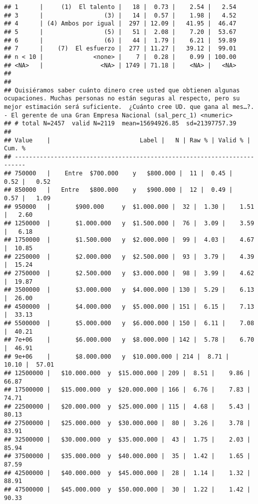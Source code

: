\documentclass[
  10,
  landscape,
  legalpaper]{article}
\begin{document}
\begin{verbatim}
## 1      |     (1)  El talento |   18 |  0.73 |    2.54 |   2.54
## 3      |                 (3) |   14 |  0.57 |    1.98 |   4.52
## 4      | (4) Ambos por igual |  297 | 12.09 |   41.95 |  46.47
## 5      |                 (5) |   51 |  2.08 |    7.20 |  53.67
## 6      |                 (6) |   44 |  1.79 |    6.21 |  59.89
## 7      |    (7)  El esfuerzo |  277 | 11.27 |   39.12 |  99.01
## n < 10 |              <none> |    7 |  0.28 |    0.99 | 100.00
## <NA>   |                <NA> | 1749 | 71.18 |    <NA> |   <NA>
## 
## 
## Quisiéramos saber cuánto dinero cree usted que obtienen algunas ocupaciones. Muchas personas no están seguras al respecto, pero su mejor estimación será suficiente.  ¿Cuánto cree UD. que gana al mes…?. - El gerente de una Gran Empresa Nacional (sal_perc_1) <numeric>
## # total N=2457  valid N=2119  mean=15694926.85  sd=21397757.39
## 
## Value    |                         Label |   N | Raw % | Valid % | Cum. %
## -------------------------------------------------------------------------
## 750000   |    Entre  $700.000    y   $800.000 |  11 |  0.45 |    0.52 |   0.52
## 850000   |   Entre   $800.000    y   $900.000 |  12 |  0.49 |    0.57 |   1.09
## 950000   |       $900.000     y  $1.000.000 |  32 |  1.30 |    1.51 |   2.60
## 1250000  |       $1.000.000   y  $1.500.000 |  76 |  3.09 |    3.59 |   6.18
## 1750000  |       $1.500.000   y  $2.000.000 |  99 |  4.03 |    4.67 |  10.85
## 2250000  |       $2.000.000   y  $2.500.000 |  93 |  3.79 |    4.39 |  15.24
## 2750000  |       $2.500.000   y  $3.000.000 |  98 |  3.99 |    4.62 |  19.87
## 3500000  |       $3.000.000   y  $4.000.000 | 130 |  5.29 |    6.13 |  26.00
## 4500000  |       $4.000.000   y  $5.000.000 | 151 |  6.15 |    7.13 |  33.13
## 5500000  |       $5.000.000   y  $6.000.000 | 150 |  6.11 |    7.08 |  40.21
## 7e+06    |       $6.000.000   y  $8.000.000 | 142 |  5.78 |    6.70 |  46.91
## 9e+06    |       $8.000.000   y  $10.000.000 | 214 |  8.71 |   10.10 |  57.01
## 12500000 |   $10.000.000  y  $15.000.000 | 209 |  8.51 |    9.86 |  66.87
## 17500000 |   $15.000.000  y  $20.000.000 | 166 |  6.76 |    7.83 |  74.71
## 22500000 |   $20.000.000  y  $25.000.000 | 115 |  4.68 |    5.43 |  80.13
## 27500000 |   $25.000.000  y  $30.000.000 |  80 |  3.26 |    3.78 |  83.91
## 32500000 |   $30.000.000  y  $35.000.000 |  43 |  1.75 |    2.03 |  85.94
## 37500000 |   $35.000.000  y  $40.000.000 |  35 |  1.42 |    1.65 |  87.59
## 42500000 |   $40.000.000  y  $45.000.000 |  28 |  1.14 |    1.32 |  88.91
## 47500000 |   $45.000.000  y  $50.000.000 |  30 |  1.22 |    1.42 |  90.33

\end{verbatim}
\end{document}
